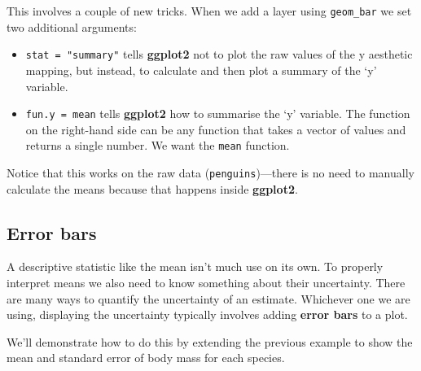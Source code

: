 \documentclass[
]{book}
\providecommand{\tightlist}{%
  \setlength{\itemsep}{0pt}\setlength{\parskip}{0pt}}
\newenvironment{greybox}{
  \definecolor{shadecolor}{rgb}{0.95,0.95,0.95}  %
  \color{black}
  \begin{shaded}}
 {\end{shaded}}
\newenvironment{infobox}[1]
  {
  \begin{itemize}
  \renewcommand{\labelitemi}{
    \raisebox{-.7\height}[0pt][0pt]{
      {\setkeys{Gin}{width=3em,keepaspectratio}
        \texttt{[image: images/\#1]}}
    }
  }
  \setlength{\fboxsep}{1em}
  \begin{greybox}
  \item
  }
  {
  \end{greybox}
  \end{itemize}
  }
\begin{document}
\begin{infobox}{information}
This involves a couple of new tricks. When we add a layer using \texttt{geom\_bar} we set two additional arguments:

\begin{itemize}
\tightlist
\item
  \texttt{stat\ =\ "summary"} tells \textbf{ggplot2} not to plot the raw values of the y aesthetic mapping, but instead, to calculate and then plot a summary of the `y' variable.
\item
  \texttt{fun.y\ =\ mean} tells \textbf{ggplot2} how to summarise the `y' variable. The function on the right-hand side can be any function that takes a vector of values and returns a single number. We want the \texttt{mean} function.
\end{itemize}

Notice that this works on the raw data (\texttt{penguins})---there is no need to manually calculate the means because that happens inside \textbf{ggplot2}.

\end{infobox}

\hypertarget{error-bars}{%
\subsection{Error bars}\label{error-bars}}

A descriptive statistic like the mean isn't much use on its own. To properly interpret means we also need to know something about their uncertainty. There are many ways to quantify the uncertainty of an estimate. Whichever one we are using, displaying the uncertainty typically involves adding \textbf{error bars} to a plot.

We'll demonstrate how to do this by extending the previous example to show the mean and standard error of body mass for each species.
\end{document}
